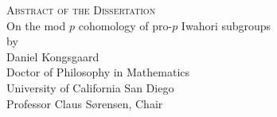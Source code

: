 \documentclass[letterpaper,oneside,english,11pt,openany]{memoir}
\begin{document}
\clearpage



\begin{center}
  {\Large\scshape Abstract of the Dissertation}\\[1.5em]
  {\large On the mod \texorpdfstring{$p$}{p} cohomology of pro-\texorpdfstring{$p$}{p} Iwahori subgroups}\\[1.5em]
  by \\[1.5em]
  Daniel Kongsgaard \\[1em]
  Doctor of Philosophy in Mathematics \\[1em]
  University of California San Diego \\[1.5em]
  Professor Claus Sørensen, Chair \\[2em]
\end{center}
\end{document}
